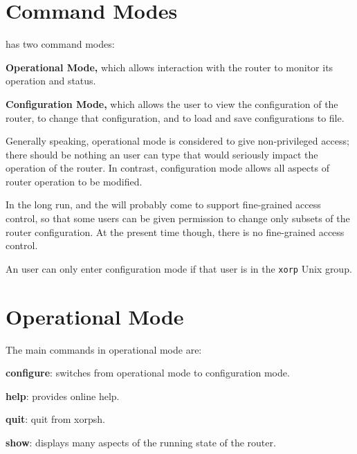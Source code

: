 \newpage
\section{Command Modes}

\xorpsh has two command modes:
\begin{description}
\item{\bf Operational Mode,}  which allows interaction with the router
to monitor its operation and status.
\item{\bf Configuration Mode,} which allows the user to view the
configuration of the router, to change that configuration, and to
load and save configurations to file.
\end{description}
Generally speaking, operational mode is considered to give
non-privileged access; there should be nothing an user can type that
would seriously impact the operation of the router.  In contrast,
configuration mode allows all aspects of router operation to be
modified.

In the long run, \xorpsh and the \rtrmgr will probably come to support
fine-grained access control, so that some users can be given
permission to change only subsets of the router configuration.  At the
present time though, there is no fine-grained access control.

An user can only enter configuration mode if that user is in the {\tt xorp}
Unix group.

\section{Operational Mode}
\noindent{}
\vspace{0.1in}

The main commands in operational mode are:
\begin{description}
\item{\bf configure}: switches from operational mode to configuration
mode.
\item{\bf help}: provides online help.
\item{\bf quit}: quit from xorpsh.
\item{\bf show}: displays many aspects of the running state of the
router.
\end{description}

